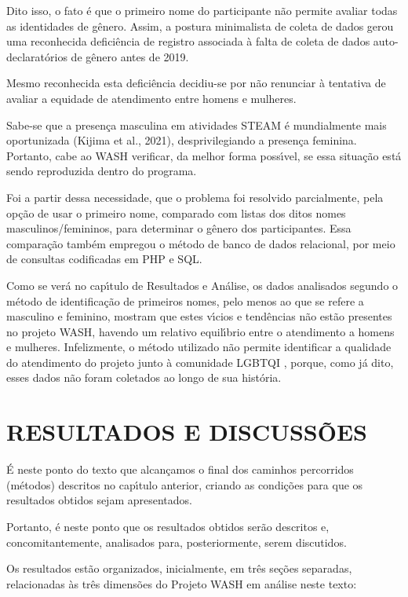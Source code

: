 \documentclass[
12pt,		%
openright,	%
twoside,  %
a4paper,			%
chapter=TITLE,		%
english,			%
french,				%
spanish,			%
brazil				%
]{USPSC-classe/USPSC}
\begin{document}
Dito isso, o fato \'e que o primeiro nome do participante n\~ao permite avaliar todas as identidades de g\^enero. Assim, a postura minimalista de coleta de dados gerou uma reconhecida defici\^encia de registro associada \`a falta de coleta de dados auto-declarat\'orios de g\^enero antes de 2019.


Mesmo reconhecida esta defici\^encia decidiu-se por n\~ao renunciar \`a tentativa de avaliar a equidade de atendimento entre homens e mulheres.


Sabe-se que a presen\c{c}a masculina em atividades STEAM \'e mundialmente mais oportunizada  (Kijima et al., 2021),  desprivilegiando a presen\c{c}a feminina. Portanto, cabe ao WASH verificar, da melhor forma poss\'{\i}vel, se essa situa\c{c}\~ao est\'a sendo reproduzida dentro do programa.


Foi a partir dessa necessidade, que o problema foi resolvido parcialmente, pela op\c{c}\~ao de usar o primeiro nome, comparado com listas dos ditos nomes masculinos/femininos, para determinar o g\^enero dos participantes. Essa compara\c{c}\~ao tamb\'em empregou o m\'etodo de banco de dados relacional, por meio de consultas codificadas em PHP e SQL.


Como se ver\'a no cap\'{\i}tulo de Resultados e An\'alise, os dados analisados segundo o m\'etodo de identifica\c{c}\~ao de primeiros nomes, pelo menos ao que se refere a masculino e feminino, mostram que estes v\'{\i}cios e tend\^encias n\~ao est\~ao presentes no projeto WASH, havendo um relativo equil\'{\i}brio entre o atendimento a homens e mulheres. Infelizmente, o m\'etodo utilizado n\~ao permite identificar a qualidade do atendimento do projeto junto \`a comunidade LGBTQI , porque, como j\'a dito, esses dados n\~ao foram coletados ao longo de sua hist\'oria.


\chapter[RESULTADOS E DISCUSS\~OES]{RESULTADOS E DISCUSS\~OES}\label{RESULTADOS E DISCUSS\~OES}
\'E neste ponto do texto que alcan\c{c}amos o final dos caminhos percorridos (m\'etodos) descritos no cap\'{\i}tulo anterior, criando as condi\c{c}\~oes para que os resultados obtidos sejam apresentados.


Portanto, \'e neste ponto que os resultados obtidos ser\~ao descritos e, concomitantemente, analisados para, posteriormente, serem discutidos.


Os resultados est\~ao organizados, inicialmente, em tr\^es se\c{c}\~oes separadas, relacionadas \`as tr\^es dimens\~oes do Projeto WASH em an\'alise neste texto:
\end{document}
